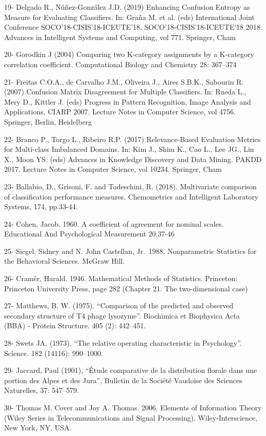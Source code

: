 \documentclass[11pt]{article}
\begin{document}
19- Delgado R., Núñez-González J.D. (2019) Enhancing Confusion Entropy
as Measure for Evaluating Classifiers. In: Graña M. et al. (eds)
International Joint Conference SOCO'18-CISIS'18-ICEUTE'18.
SOCO'18-CISIS'18-ICEUTE'18 2018. Advances in Intelligent Systems and
Computing, vol 771. Springer, Cham

20- Gorodkin J (2004) Comparing two K-category assignments by a
K-category correlation coefficient. Computational Biology and Chemistry
28: 367--374

21- Freitas C.O.A., de Carvalho J.M., Oliveira J., Aires S.B.K.,
Sabourin R. (2007) Confusion Matrix Disagreement for Multiple
Classifiers. In: Rueda L., Mery D., Kittler J. (eds) Progress in Pattern
Recognition, Image Analysis and Applications. CIARP 2007. Lecture Notes
in Computer Science, vol 4756. Springer, Berlin, Heidelberg

22- Branco P., Torgo L., Ribeiro R.P. (2017) Relevance-Based Evaluation
Metrics for Multi-class Imbalanced Domains. In: Kim J., Shim K., Cao L.,
Lee JG., Lin X., Moon YS. (eds) Advances in Knowledge Discovery and Data
Mining. PAKDD 2017. Lecture Notes in Computer Science, vol 10234.
Springer, Cham

23- Ballabio, D., Grisoni, F. and Todeschini, R. (2018). Multivariate
comparison of classification performance measures. Chemometrics and
Intelligent Laboratory Systems, 174, pp.33-44.

24- Cohen, Jacob. 1960. A coefficient of agreement for nominal scales.
Educational And Psychological Measurement 20:37-46

25- Siegel, Sidney and N. John Castellan, Jr.~1988. Nonparametric
Statistics for the Behavioral Sciences. McGraw Hill.

26- Cramér, Harald. 1946. Mathematical Methods of Statistics. Princeton:
Princeton University Press, page 282 (Chapter 21. The two-dimensional
case)

27- Matthews, B. W. (1975). ``Comparison of the predicted and observed
secondary structure of T4 phage lysozyme''. Biochimica et Biophysica
Acta (BBA) - Protein Structure. 405 (2): 442--451.

28- Swets JA. (1973). ``The relative operating characteristic in
Psychology''. Science. 182 (14116): 990--1000.

29- Jaccard, Paul (1901), ``Étude comparative de la distribution florale
dans une portion des Alpes et des Jura'', Bulletin de la Société
Vaudoise des Sciences Naturelles, 37: 547--579.

30- Thomas M. Cover and Joy A. Thomas. 2006. Elements of Information
Theory (Wiley Series in Telecommunications and Signal Processing).
Wiley-Interscience, New York, NY, USA.
\end{document}
